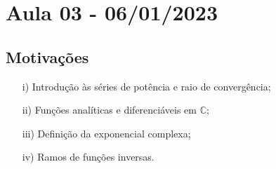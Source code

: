 \documentclass{article}
\begin{document}
  \section{Aula 03 - 06/01/2023}
  \subsection{Motiva\c c\~oes}
  \begin{itemize}
    \item[i)] Introdu\c c\~ao \`as s\'eries de pot\^encia e raio de converg\^encia;
    \item[ii)] Fun\c c\~oes anal\'iticas e diferenci\'aveis em $\mathbb{C}$;
    \item[iii)] Defini\c c\~ao da exponencial complexa;
    \item[iv)] Ramos de fun\c c\~oes inversas.
  \end{itemize}
\end{document}
